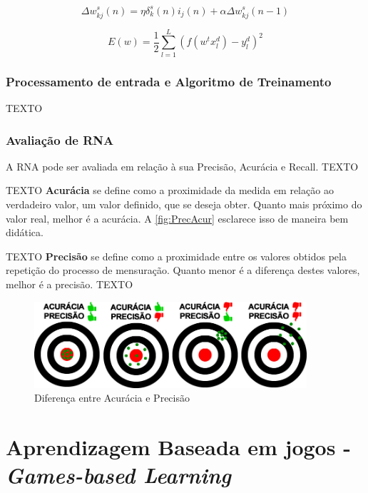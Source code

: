 \begin{equation}
    \Delta w_{kj}^{s}(n) = \eta \delta_{k}^{s}(n) i_{j}(n) + \alpha \Delta w_{kj}^{s} (n-1)
\end{equation}

\begin{equation}
    E(w) = \frac{1}{2}\sum_{l=1}^{L}(f(w^{t}x_{l}^{d})-y_{l}^{d})^{2}
\end{equation}

\subsubsection{Processamento de entrada e Algoritmo de Treinamento}
{\color{red}TEXTO}

\subsubsection{Avaliação de RNA}
A RNA pode ser avaliada em relação à sua Precisão, Acurácia e Recall.
{\color{red}TEXTO}

{\color{red}TEXTO}
\textbf{Acurácia} se define como a proximidade da medida em relação ao verdadeiro valor, um valor definido, que se deseja obter. Quanto mais próximo do valor real, melhor é a acurácia. A \autoref{fig:PrecAcur} esclarece isso de maneira bem didática.

{\color{red}TEXTO}
\textbf{Precisão} se define como a proximidade entre os valores obtidos pela repetição do processo de mensuração. Quanto menor é a diferença destes valores, melhor é a precisão. 
{\color{red}TEXTO}

\begin{figure}
    \centering
    \includegraphics[width=0.9\textwidth]{modelo-monografia-rej-2018/img/PrecisaoAcuracia.jpg}
    \caption{Diferença entre Acurácia e Precisão}
    \label{fig:PrecAcur}
\end{figure}

\section{Aprendizagem Baseada em jogos - \textit{Games-based Learning}}
\label{sec:GBL}

